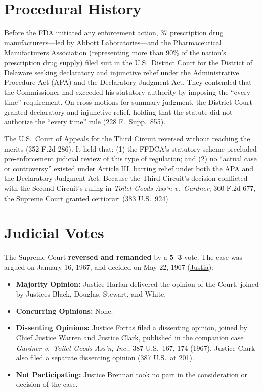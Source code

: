 \documentclass[12pt]{article}
\begin{document}
\section{Procedural History}
Before the FDA initiated any enforcement action, 37 prescription drug manufacturers---led by Abbott Laboratories---and the Pharmaceutical Manufacturers Association (representing more than 90\% of the nation's prescription drug supply) filed suit in the U.S.\ District Court for the District of Delaware seeking declaratory and injunctive relief under the Administrative Procedure Act (APA) and the Declaratory Judgment Act. They contended that the Commissioner had exceeded his statutory authority by imposing the ``every time'' requirement. On cross-motions for summary judgment, the District Court granted declaratory and injunctive relief, holding that the statute did not authorize the ``every time'' rule (228 F.\ Supp.\ 855).

The U.S.\ Court of Appeals for the Third Circuit reversed without reaching the merits (352 F.2d 286). It held that: (1) the FFDCA's statutory scheme precluded pre-enforcement judicial review of this type of regulation; and (2) no ``actual case or controversy'' existed under Article III, barring relief under both the APA and the Declaratory Judgment Act. Because the Third Circuit's decision conflicted with the Second Circuit's ruling in \textit{Toilet Goods Ass'n v.\ Gardner}, 360 F.2d 677, the Supreme Court granted certiorari (383 U.S.\ 924).

\section{Judicial Votes}
The Supreme Court \textbf{reversed and remanded} by a \textbf{5--3} vote. The case was argued on January 16, 1967, and decided on May 22, 1967 (\href{https://supreme.justia.com/cases/federal/us/387/136/}{Justia}):

\begin{itemize}
    \item \textbf{Majority Opinion:} Justice Harlan delivered the opinion of the Court, joined by Justices Black, Douglas, Stewart, and White.
    \item \textbf{Concurring Opinions:} None.
    \item \textbf{Dissenting Opinions:} Justice Fortas filed a dissenting opinion, joined by Chief Justice Warren and Justice Clark, published in the companion case \textit{Gardner v.\ Toilet Goods Ass'n, Inc.}, 387 U.S.\ 167, 174 (1967). Justice Clark also filed a separate dissenting opinion (387 U.S.\ at 201).
    \item \textbf{Not Participating:} Justice Brennan took no part in the consideration or decision of the case.
\end{itemize}
\end{document}
